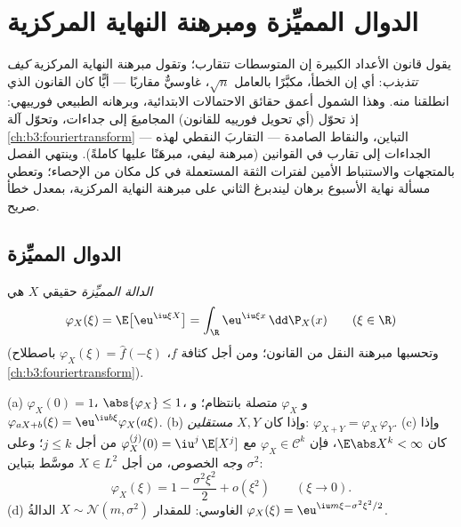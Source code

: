 \chapter{الدوال المميِّزة ومبرهنة النهاية
المركزية}\label{ch:b3:clt}

يقول قانون الأعداد الكبيرة إن المتوسطات تتقارب؛ وتقول مبرهنة
النهاية المركزية \emph{كيف تتذبذب}: أي إن الخطأ، مكبَّرًا
بالعامل $\sqrt n$، غاوسيٌّ مقاربًا --- أيًّا كان القانون الذي
انطلقنا منه. وهذا الشمول أعمق حقائق الاحتمالات الابتدائية،
وبرهانه الطبيعي فورييهي: إذ تحوّل \emph{} (أي
تحويل فورييه للقانون) المجاميعَ  إلى جداءات، وتحوّل
آلة \cref{ch:b3:fouriertransform} --- التباين، والنقاط الصامدة  --- التقاربَ
النقطي لهذه الجداءات إلى تقارب في القوانين (مبرهنة ليفي،
مبرهَنًا عليها كاملةً). وينتهي الفصل بالمتجهات 
والاستنباط الأمين لفترات الثقة المستعملة في كل مكان من
الإحصاء؛ وتعطي مسألة نهاية الأسبوع برهان ليندبرغ الثاني على
مبرهنة النهاية المركزية، بمعدل خطأ صريح.

\section{الدوال المميِّزة}

\begin{definition}\label{def:b3:clt:cf}
\emph{الدالة المميِّزة} 
حقيقي $X$ هي
\[
\varphi_X(\xi) = \E\bigl[\eu^{\iu\xi X}\bigr]
= \int_\R \eu^{\iu\xi x}\,\dd\P_X(x)
\qquad (\xi \in \R)
\]
(وتحسبها مبرهنة النقل من القانون؛ ومن أجل كثافة $f$، $\varphi_X(\xi) = \hat f(-\xi)$
باصطلاح \cref{ch:b3:fouriertransform}).
\end{definition}

\begin{proposition}\label{prop:b3:clt:cfbasics}
(a) $\varphi_X(0) = 1$، $\abs{\varphi_X} \leq 1$، و $\varphi_X$ متصلة بانتظام؛ و $\varphi_{aX + b}(\xi) = \eu^{\iu b\xi}\varphi_X(a\xi)$.
(b) وإذا كان $X, Y$ \emph{مستقلين}: $\varphi_{X+Y} = \varphi_X\,\varphi_Y$.
(c) وإذا كان $\E\abs X^k < \infty$، فإن $\varphi_X \in \mathcal
C^k$ مع $\varphi_X^{(j)}(0) = \iu^j\,\E[X^j]$ من أجل $j \leq
k$؛ وعلى
وجه الخصوص، من أجل $X \in L^2$ موسَّط بتباين $\sigma^2$:
\[
\varphi_X(\xi) = 1 - \frac{\sigma^2\xi^2}{2} +
o(\xi^2) \qquad (\xi \to 0).
\]
(d) الغاوسي: للمقدار $X \sim \mathcal N(m, \sigma^2)$ الدالةُ $\varphi_X(\xi) = \eu^{\iu m\xi - \sigma^2\xi^2/2}$.
\end{proposition}

